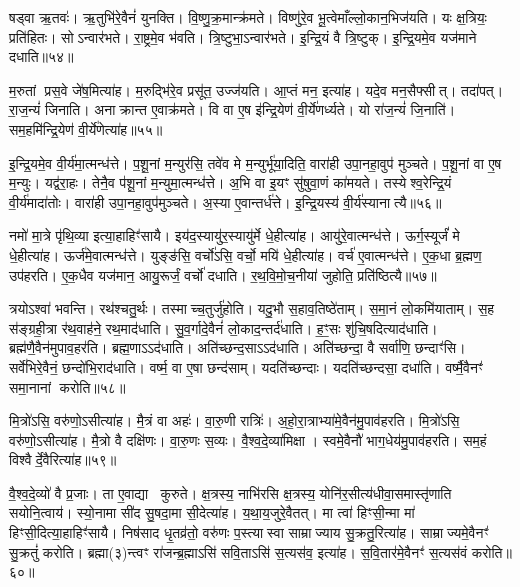षड्वा ऋ॒तवः॑।
ऋ॒तुभि॑रे॒वैनं॑ युनक्ति।
वि॒ष्णु॒क्र॒मान्क्र॑मते।
विष्णु॑रे॒व भू॒त्वेमाँल्लो॒कान॒भिज॑यति।
यः क्ष॒त्रियः॒ प्रति॑हितः।
सोऽन्वार॑भते।
रा॒ष्ट्रमे॒व भ॑वति।
त्रि॒ष्टुभा॒\-ऽन्वार॑भते।
इ॒न्द्रि॒यं वै त्रि॒ष्टुक्।
इ॒न्द्रि॒यमे॒व यज॑माने दधाति॥५४॥

म॒रुतां प्रस॒वे जे॑ष॒मित्या॑ह।
म॒रुद्भि॑रे॒व प्रसू॑त॒ उज्ज॑यति।
आ॒प्तं मन॒ इत्या॑ह।
यदे॒व मन॒सैफ्सीत्।
तदा॑पत्।
रा॒ज॒न्यं॑ जिनाति।
अनाक्रान्त ए॒वाक्र॑मते।
वि वा ए॒ष इ॑न्द्रि॒येण॑ वी॒र्ये॑णर्ध्यते।
यो रा॑ज॒न्यं॑ जि॒नाति॑।
सम॒हमि॑न्द्रि॒येण॑ वी॒र्ये॑णेत्या॑ह॥५५॥

इ॒न्द्रि॒यमे॒व वी॒र्य॑मा॒त्मन्ध॑त्ते।
प॒शू॒नां म॒न्युर॑सि॒ तवे॑व मे म॒न्युर्भू॑या॒दिति॒ वारा॑ही उपा॒नहा॒वुप॑ मुञ्चते।
प॒शू॒नां वा ए॒ष म॒न्युः।
यद्व॑रा॒हः।
तेनै॒व प॑शू॒नां म॒न्युमा॒त्मन्ध॑त्ते।
अ॒भि वा इ॒यꣳ सु॑षुवा॒णं का॑मयते।
तस्येश्व॒रेन्द्रि॒यं वी॒र्य॑मादा॑तोः।
वारा॑ही उपा॒नहा॒वुप॑मुञ्चते।
अ॒स्या ए॒वान्तर्ध॑त्ते।
इ॒न्द्रि॒यस्य॑ वी॒र्य॑स्यानात्यै॥५६॥

नमो॑ मा॒त्रे पृ॑थि॒व्या इत्या॒हाहिꣳ॑सायै।
इय॑द॒स्यायु॑र॒स्यायु॑र्मे धे॒हीत्या॑ह।
आयु॑रे॒वात्मन्ध॑त्ते।
ऊर्ग॒स्यूर्जं॑ मे धे॒हीत्या॑ह।
ऊर्ज॑मे॒वात्मन्ध॑त्ते।
युङ्ङ॑सि॒ वर्चो॑ऽसि॒ वर्चो॒ मयि॑ धे॒हीत्या॑ह।
वर्च॑ ए॒वात्मन्ध॑त्ते।
ए॒क॒धा ब्र॒ह्मण॒ उप॑हरति।
ए॒क॒धैव यज॑मान॒ आयु॒रूर्जं॒ वर्चो॑ दधाति।
र॒थ॒वि॒मो॒च॒नीया॑ जुहोति॒ प्रति॑ष्ठित्यै॥५७॥

त्रयो\-ऽश्वा॑ भवन्ति।
रथ॑श्चतु॒र्थः।
तस्माच्च॒तुर्जु॑होति।
यदु॒भौ स॒हाव॒तिष्ठे॑ताम्।
स॒मा॒नं लो॒कमि॑याताम्।
स॒ह स॑ङ्ग्रही॒त्रा र॑थ॒वाह॑ने॒ रथ॒माद॑धाति।
सु॒व॒र्गादे॒वैनं॑ लो॒काद॒न्तर्द॑धाति।
ह॒ꣳ॒सः शु॑चि॒षदित्याद॑धाति।
ब्रह्म॑णै॒वैन॑मुपाव॒हर॑ति।
ब्रह्म॒णा\-ऽऽद॑धाति।
अति॑च्छन्द॒सा\-ऽऽद॑धाति।
अति॑च्छन्दा॒ वै सर्वा॑णि॒ छन्दाꣳ॑सि।
सर्वे॑भिरे॒वैनं॒ छन्दो॑भि॒राद॑धाति।
वर्ष्म॒ वा ए॒षा छन्द॑साम्।
यदति॑च्छन्दाः।
यदति॑च्छन्दसा॒ दधा॑ति।
वर्ष्मै॒वैनꣳ॑ समा॒नानां करोति॥५८॥\anuvakamend[प॒द्य॒न्ते॒ द॒धा॒ति॒ वी॒र्ये॑णेत्या॒हानात्यै॒ प्रति॑ष्ठित्यै॒ ब्रह्म॒णा\-ऽऽद॑धाति स॒प्त च॑]

मि॒त्रो॑ऽसि॒ वरु॑णो॒\-ऽसीत्या॑ह।
मै॒त्रं वा अहः॑।
वा॒रु॒णी रात्रिः॑।
अ॒हो॒रा॒त्राभ्या॑मे॒वैन॑मु॒पाव॑हरति।
मि॒त्रो॑ऽसि॒ वरु॑णो॒\-ऽसीत्या॑ह।
मै॒त्रो वै दक्षि॑णः।
वा॒रु॒णः स॒व्यः।
वै॒श्व॒दे॒व्या॑मिक्षा।
स्वमे॒वैनौ॑ भाग॒धेय॑मु॒पाव॑हरति।
सम॒हं विश्वैर्दे॒वैरित्या॑ह॥५९॥

वै॒श्व॒दे॒व्यो॑ वै प्र॒जाः।
ता ए॒वाद्या कुरुते।
क्ष॒त्रस्य॒ नाभि॑रसि क्ष॒त्रस्य॒ योनि॑र॒सीत्य॑धीवा॒समास्तृ॑णाति सयोनि॒त्वाय॑।
स्यो॒नामा सी॑द सु॒षदा॒मा सी॒देत्या॑ह।
य॒था॒य॒जुरे॒वैतत्।
मा त्वा॑ हिꣳसी॒न्मा मा॑ हिꣳसी॒दित्या॒हाहिꣳ॑सायै।
निष॑साद धृ॒तव्र॑तो॒ वरु॑णः प॒स्त्यास्वा साम्राज्याय सु॒क्रतु॒रित्या॑ह।
साम्राज्यमे॒वैनꣳ॑ सु॒क्रतुं॑ करोति।
ब्रह्मा(३)न्त्वꣳ रा॑जन्ब्र॒ह्माऽसि॑ सवि॒ताऽसि॑ स॒त्यस॑व॒ इत्या॑ह।
स॒वि॒तार॑मे॒वैनꣳ॑ स॒त्यस॑वं करोति॥६०॥


